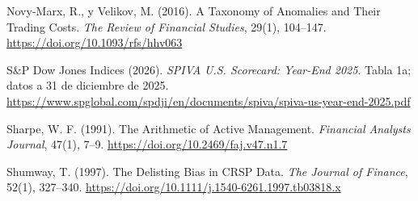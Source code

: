 \begin{list}{}{%
  \setlength{\leftmargin}{2em}%
  \setlength{\itemindent}{-2em}%
  \setlength{\itemsep}{0.55em}%
  \setlength{\parsep}{0pt}%
}
\item Novy-Marx, R., y Velikov, M. (2016). A Taxonomy of Anomalies and Their Trading Costs.
  \textit{The Review of Financial Studies}, 29(1), 104--147.
  \url{https://doi.org/10.1093/rfs/hhv063}

\item S\&P Dow Jones Indices (2026). \textit{SPIVA U.S. Scorecard: Year-End 2025}.
  Tabla 1a; datos a 31 de diciembre de 2025.
  \url{https://www.spglobal.com/spdji/en/documents/spiva/spiva-us-year-end-2025.pdf}

\item Sharpe, W. F. (1991). The Arithmetic of Active Management.
  \textit{Financial Analysts Journal}, 47(1), 7--9.
  \url{https://doi.org/10.2469/faj.v47.n1.7}

\item Shumway, T. (1997). The Delisting Bias in CRSP Data.
  \textit{The Journal of Finance}, 52(1), 327--340.
  \url{https://doi.org/10.1111/j.1540-6261.1997.tb03818.x}

\end{list}
